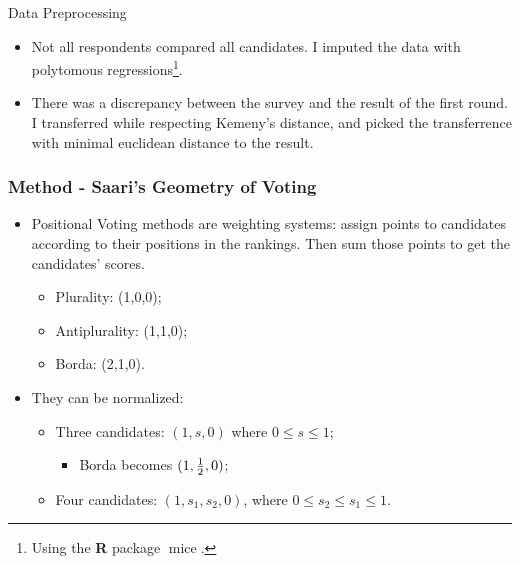 \documentclass[xcolor={svgnames}]{beamer}
\begin{document}
\begin{frame}{Data Preprocessing}
  \begin{itemize}
    \item Not all respondents compared all candidates. I imputed the data with polytomous regressions\footnote{Using the \textbf{\textsf{R}} package
          \(\operatorname{mice}.\)}.
    \item There was a discrepancy between the survey and the result of the first
          round. I transferred while respecting Kemeny's distance, and picked
          the transferrence with minimal euclidean distance to the result.
  \end{itemize}
\end{frame}
\begin{frame}
  \frametitle{Method - Saari's Geometry of Voting }
  \begin{itemize}
    \item Positional Voting methods are weighting systems: assign points to
          candidates according to their positions in the rankings. Then sum
          those points to get the candidates' scores.
          \begin{itemize}
            \item Plurality: (1,0,0);
            \item Antiplurality: (1,1,0);
            \item Borda: (2,1,0).
          \end{itemize}

     \item They can be normalized:
    \begin{itemize}
      \item Three candidates: \((1,s,0)\) where \(0 \leq s \leq 1\);
      \begin{itemize}
        \item Borda becomes \((1,{1 \over 2},0)\);
      \end{itemize}
      \item Four candidates: \((1,s_{1},s_{2},0)\),
            where \(0 \leq s_{2} \leq s_{1} \leq 1\).
          \end{itemize}
\end{itemize}
  \end{frame}
\end{document}

